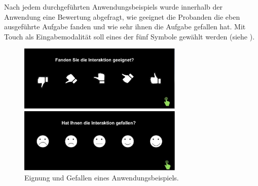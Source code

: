Nach jedem durchgeführten Anwendungsbeispiels wurde innerhalb der Anwendung eine Bewertung abgefragt, wie geeignet die Probanden die eben ausgeführte Aufgabe fanden und wie sehr ihnen die Aufgabe gefallen hat. 
Mit Touch als Eingabemodalität soll eines der fünf Symbole gewählt werden (siehe ).
\begin{figure}[ht]
	\centering
		\includegraphics[width=0.7\textwidth]{img/Smileys.JPG}
	\caption[Eignung und Gefallen eines Anwendungsbeispiels]{Eignung und Gefallen eines Anwendungsbeispiels. 
}
	\label{fig:Smileys}
\end{figure}

